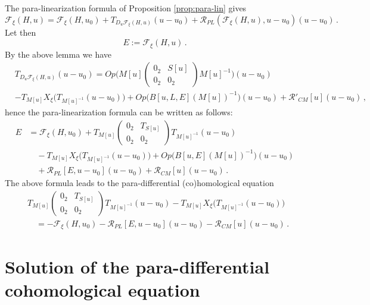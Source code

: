 \documentclass[11pt]{amsart}
\begin{document}
The para-linearization formula of Proposition \ref{prop:para-lin} gives
$$
\mathcal{F}_\xi(H, u)  = \mathcal{F}_\xi(H, u_0) + T_{D_u \mathcal{F}_\xi(H, u)} (u-u_0) + \mathcal R_{PL} (\mathcal{F}_\xi(H, u) ,  u-u_0) (u-u_0)\,.
$$
 Let then
$$
E := \mathcal{F}_\xi(H, u) \,.
$$
By the above lemma we have
$$
\begin{aligned}
&T_{D_u \mathcal{F}_\xi(H, u)} (u-u_0)  =  Op \Big ( M[u] \begin{pmatrix} 0_2 & S[u] \\ 0_2 & 0_2 \end{pmatrix} M[u]^{-1} \Big) (u-u_0) \\ &   - 
T_{ M[u] } X_\xi \Big(T_{M[u]^{-1} }  (u-u_0) \Big)  + Op \Big( B[u,L, E] (M[u])^{-1} \Big) (u-u_0) + \mathcal R'_{CM}[u] (u-u_0) \,, 
\end{aligned}
$$
hence the para-linearization formula can be written as follows:
$$
\begin{aligned}
E&= \mathcal{F}_\xi(H, u_0)   + T_{M[u]}  \begin{pmatrix} 0_2 & T_{S[u]} \\ 0_2 & 0_2 \end{pmatrix} T_{M[u]^{-1}}  (u-u_0) \\ & \quad  - 
T_{ M[u] } X_\xi \Big(T_{M[u]^{-1} }  (u-u_0) \Big) + Op \Big( B [u,E] (M[u])^{-1} \Big) (u-u_0)  \\ &
\quad + 
\mathcal R_{PL}[E, u-u_0 ] (u-u_0) + \mathcal R_{CM}[u] (u-u_0) \,.
\end{aligned} 
$$
The above formula leads to the para-differential (co)homological equation
$$
\begin{aligned}
&  T_{M[u]} \begin{pmatrix} 0_2 & T_{S[u]} \\ 0_2 & 0_2 \end{pmatrix} T_{M[u]^{-1}}  (u-u_0)  - 
T_{ M[u] } X_\xi \Big(T_{M[u]^{-1} }  (u-u_0) \Big)   \\ & \quad    
 =   -\mathcal{F}_\xi(H, u_0) -\mathcal R_{PL}[E, u-u_0 ] (u-u_0) - \mathcal R_{CM}[u] (u-u_0)    \,.
\end{aligned}
$$

\section{Solution of the para-differential cohomological equation}
\end{document}
